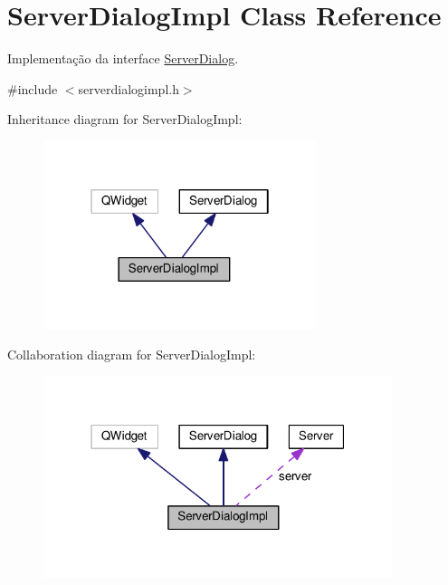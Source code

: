\hypertarget{classServerDialogImpl}{}\section{Server\+Dialog\+Impl Class Reference}
\label{classServerDialogImpl}


Implementação da interface \hyperlink{classServerDialog}{Server\+Dialog}.  




{\ttfamily \#include $<$serverdialogimpl.\+h$>$}



Inheritance diagram for Server\+Dialog\+Impl\+:
\nopagebreak
\begin{figure}[H]
\begin{center}
\leavevmode
\includegraphics[width=226pt]{d1/da5/classServerDialogImpl__inherit__graph}
\end{center}
\end{figure}


Collaboration diagram for Server\+Dialog\+Impl\+:
\nopagebreak
\begin{figure}[H]
\begin{center}
\leavevmode
\includegraphics[width=289pt]{d3/d6b/classServerDialogImpl__coll__graph}
\end{center}
\end{figure}
